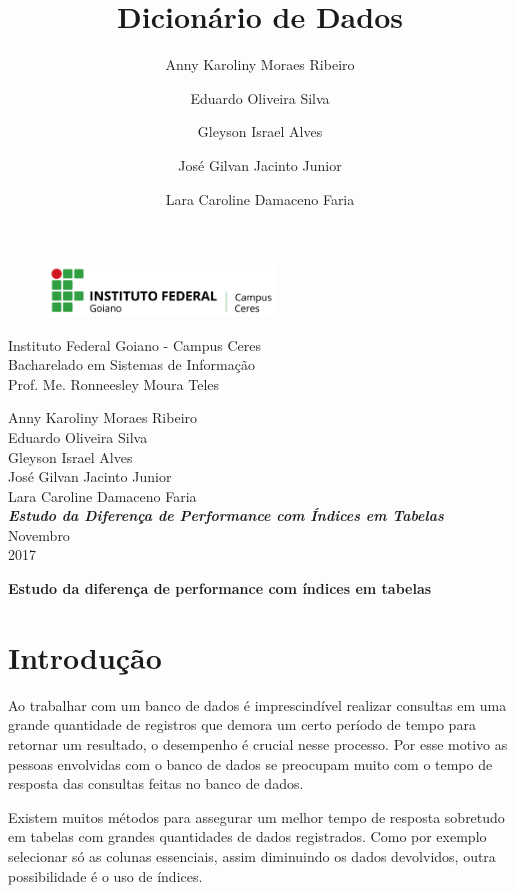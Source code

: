 \documentclass[12pt,a4paper]{article}
\title{Dicionário de Dados}
\author{Anny Karoliny Moraes Ribeiro \and Eduardo Oliveira Silva \and Gleyson Israel Alves \and José Gilvan Jacinto Junior \and Lara Caroline Damaceno Faria}
\begin{document}
\begin{titlepage}
\begin{center}
\begin{figure}[htb]
	\label{figura:LogoIF}
	\centering
	\includegraphics[width=6cm]{recursos/imagens/logo.png} 
\end{figure}
Instituto Federal Goiano - Campus Ceres\\
Bacharelado em Sistemas de Informação\\
Prof. Me. Ronneesley Moura Teles\\\vspace{1cm}

Anny Karoliny Moraes Ribeiro\\Eduardo Oliveira Silva\\Gleyson Israel Alves\\José Gilvan Jacinto Junior\\Lara Caroline Damaceno Faria\\\vspace{6.0cm}
\textit{\textbf{\Large{Estudo da Diferença de Performance com Índices em Tabelas}}}\\\vspace{10cm}
Novembro\\
2017\\
\end{center}
\end{titlepage}
\tableofcontents
\newpage
\begin{center}
\textbf{\Large{Estudo da diferença de performance com índices em tabelas}}\\\vspace{0.5cm}
\end{center}
\section{Introdução}

Ao trabalhar com um banco de dados é imprescindível realizar consultas em uma grande quantidade de registros que demora um certo período de tempo para retornar um resultado, o desempenho é crucial nesse processo. Por esse motivo as pessoas envolvidas com o banco de dados se preocupam muito com o tempo de resposta das consultas feitas no banco de dados.

Existem muitos métodos para assegurar um melhor tempo de resposta sobretudo em tabelas com grandes quantidades de dados registrados. Como por exemplo selecionar só as colunas essenciais, assim diminuindo os dados devolvidos, outra possibilidade é o uso de índices.
\end{document}
